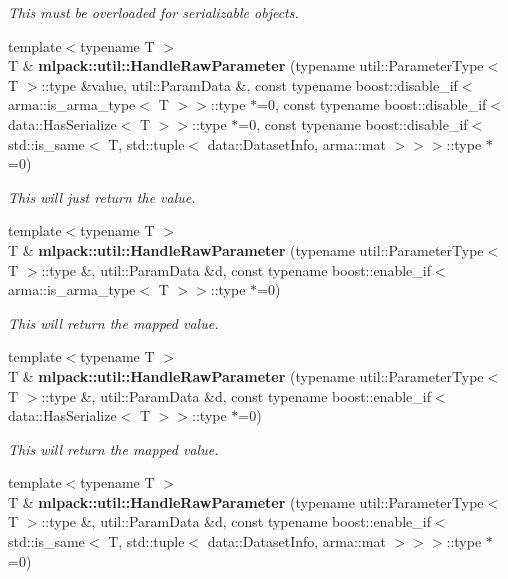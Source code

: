 \begin{DoxyCompactItemize}
\begin{DoxyCompactList}\small\item\em This must be overloaded for serializable objects. \end{DoxyCompactList}\item 
{\footnotesize template$<$typename T $>$ }\\T \& {\bf mlpack\+::util\+::\+Handle\+Raw\+Parameter} (typename util\+::\+Parameter\+Type$<$ T $>$\+::type \&value, util\+::\+Param\+Data \&, const typename boost\+::disable\+\_\+if$<$ arma\+::is\+\_\+arma\+\_\+type$<$ T $>$$>$\+::type $\ast$=0, const typename boost\+::disable\+\_\+if$<$ data\+::\+Has\+Serialize$<$ T $>$$>$\+::type $\ast$=0, const typename boost\+::disable\+\_\+if$<$ std\+::is\+\_\+same$<$ T, std\+::tuple$<$ data\+::\+Dataset\+Info, arma\+::mat $>$$>$$>$\+::type $\ast$=0)
\begin{DoxyCompactList}\small\item\em This will just return the value. \end{DoxyCompactList}\item 
{\footnotesize template$<$typename T $>$ }\\T \& {\bf mlpack\+::util\+::\+Handle\+Raw\+Parameter} (typename util\+::\+Parameter\+Type$<$ T $>$\+::type \&, util\+::\+Param\+Data \&d, const typename boost\+::enable\+\_\+if$<$ arma\+::is\+\_\+arma\+\_\+type$<$ T $>$$>$\+::type $\ast$=0)
\begin{DoxyCompactList}\small\item\em This will return the mapped value. \end{DoxyCompactList}\item 
{\footnotesize template$<$typename T $>$ }\\T \& {\bf mlpack\+::util\+::\+Handle\+Raw\+Parameter} (typename util\+::\+Parameter\+Type$<$ T $>$\+::type \&, util\+::\+Param\+Data \&d, const typename boost\+::enable\+\_\+if$<$ data\+::\+Has\+Serialize$<$ T $>$$>$\+::type $\ast$=0)
\begin{DoxyCompactList}\small\item\em This will return the mapped value. \end{DoxyCompactList}\item 
{\footnotesize template$<$typename T $>$ }\\T \& {\bf mlpack\+::util\+::\+Handle\+Raw\+Parameter} (typename util\+::\+Parameter\+Type$<$ T $>$\+::type \&, util\+::\+Param\+Data \&d, const typename boost\+::enable\+\_\+if$<$ std\+::is\+\_\+same$<$ T, std\+::tuple$<$ data\+::\+Dataset\+Info, arma\+::mat $>$$>$$>$\+::type $\ast$=0)

\end{DoxyCompactItemize}
